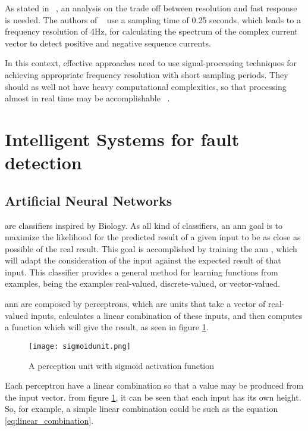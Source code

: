 As stated in ~\cite{Cheng2011}, an analysis on the trade off between resolution and fast response is needed. The authors of ~\cite{Cheng2011} use a sampling time of 0.25 seconds, which leads to a frequency resolution of 4Hz, for calculating the spectrum of the complex current vector to detect positive and negative sequence currents.

In this context, effective approaches need to use signal-processing techniques for achieving appropriate frequency resolution with short sampling periods. They should as well not have heavy computational complexities, so that processing almost in real time may be accomplishable ~\cite{Riera-Guasp2015}. 

\section{Intelligent Systems for fault detection} %
\label{sec:machine_learning_approaches}

\subsection{Artificial Neural Networks} %
\label{sec:ann}

 are classifiers inspired by Biology. As all kind of classifiers, an \Acrshort{ann} goal is to maximize the likelihood for the predicted result of a given input to be as close as possible of the real result. This goal is accomplished by training the \Acrshort{ann} , which will adapt the consideration of the input against the expected result of that input. This classifier provides a general method for learning functions from examples, being the examples real-valued, discrete-valued, or vector-valued.

\Acrshort{ann} are composed by perceptrons, which are units that take a vector of real-valued inputs, calculates a linear combination of these inputs, and then computes a function which will give the result, as seen in figure \ref{fig:sigmoid_unit}.

\begin{figure}[htpb]
\centering
\texttt{[image: sigmoidunit.png]}
\caption{A perception unit with sigmoid activation function}
\label{fig:sigmoid_unit}
\end{figure}

Each perceptron have a linear combination so that a value may be produced from the input vector. from figure \ref{fig:sigmoid_unit}, it can be seen that each input has its own height. So, for example, a simple linear combination could be such as the equation \ref{eq:linear_combination}.

